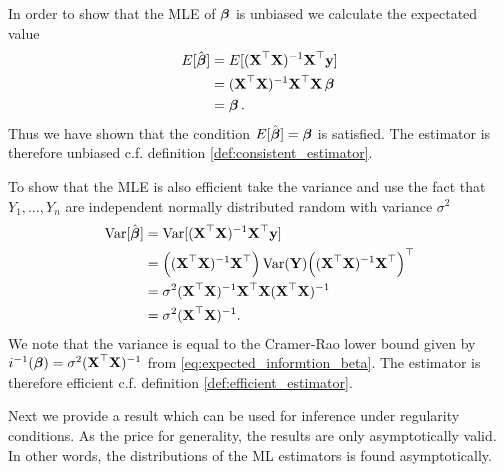 \begin{example}
In order to show that the MLE of $\operatorname{\boldsymbol{\beta}}$ is unbiased we calculate the expectated value
\begin{align*}
    E[\hat{\operatorname{\boldsymbol{\beta}}}]&=E[(\textbf{X}^\top\textbf{X})^{-1}\textbf{X}^\top \textbf{y}] \\
    &=(\textbf{X}^\top\textbf{X})^{-1}\textbf{X}^\top \textbf{X}\operatorname{\boldsymbol{\beta}} \\
    &= \operatorname{\boldsymbol{\beta}}.
\end{align*}
Thus we have shown that the condition $E[\hat{\operatorname{\boldsymbol{\beta}}}] = \operatorname{\boldsymbol{\beta}}$ is satisfied. The estimator is therefore unbiased c.f. definition \ref{def:consistent_estimator}.


To show that the MLE is also efficient take the variance and use the fact that $Y_1,\ldots,Y_n$ are independent normally distributed random with variance $\sigma^2$
\begin{align*}
\operatorname{\text{Var}}[\hat{\operatorname{\boldsymbol{\beta}}}]&=\operatorname{\text{Var}}[(\textbf{X}^\top\textbf{X})^{-1}\textbf{X}^\top \textbf{y}] \\
&=\Big((\textbf{X}^\top\textbf{X})^{-1}\textbf{X}^\top \Big) \operatorname{\text{Var}}(\textbf{Y}) \Big((\textbf{X}^\top\textbf{X})^{-1}\textbf{X}^\top\Big)^\top\\
&= \sigma^2 (\textbf{X}^\top\textbf{X})^{-1}\textbf{X}^\top\textbf{X}(\textbf{X}^\top\textbf{X})^{-1} \\
&= \sigma^2 (\textbf{X}^\top\textbf{X})^{-1}.
\end{align*}
We note that the variance is equal to the Cramer-Rao lower bound given by $i^{-1}(\operatorname{\boldsymbol{\beta}})=\sigma^2 (\textbf{X}^\top\textbf{X})^{-1}$ from \eqref{eq:expected_informtion_beta}. The estimator is therefore efficient c.f. definition \ref{def:efficient_estimator}.
\end{example}

Next we provide a result which can be used for inference under regularity conditions. 
As the price for generality, the results are only asymptotically valid. 
In other words, the distributions of the ML estimators is found asymptotically. 

